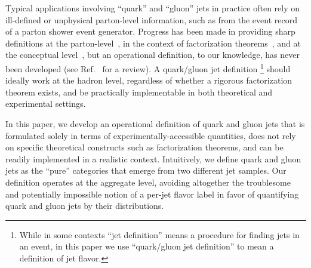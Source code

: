\documentclass[letterpaper,11pt]{article}
\DeclareRobustCommand{\Ref}[1]{Ref.~\cite{#1}}
\begin{document}
Typical applications involving ``quark'' and ``gluon'' jets in practice often rely on ill-defined or unphysical parton-level information, such as from the event record of a parton shower event generator.
%
Progress has been made in providing sharp definitions at the parton-level~\cite{Banfi:2006hf,Buckley:2015gua}, in the context of factorization theorems~\cite{Gallicchio:2011xc,Frye:2016okc,Frye:2016aiz}, and at the conceptual level~\cite{Badger:2016bpw}, but an operational definition, to our knowledge, has never been developed (see \Ref{Gras:2017jty} for a review).
%
A quark/gluon jet definition%
\footnote{While in some contexts ``jet definition'' means a procedure for finding jets in an event, in this paper we use ``quark/gluon jet definition'' to mean a definition of jet flavor.}
should ideally work at the hadron level, regardless of whether a rigorous factorization theorem exists, and be practically implementable in both theoretical and experimental settings.


In this paper, we develop an operational definition of quark and gluon jets that is formulated solely in terms of experimentally-accessible quantities, does not rely on specific theoretical constructs such as factorization theorems, and can be readily implemented in a realistic context.
%
Intuitively, we define quark and gluon jets as the ``pure'' categories that emerge from two different jet samples.
%
Our definition operates at the aggregate level, avoiding altogether the troublesome and potentially impossible notion of a per-jet flavor label in favor of quantifying quark and gluon jets by their distributions.
\end{document}
